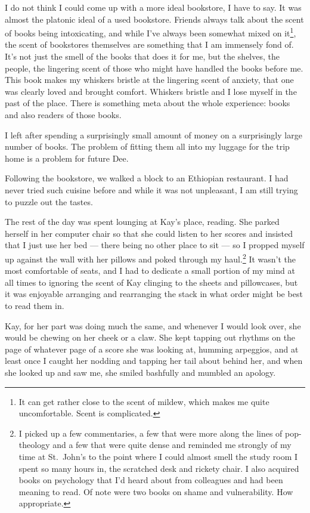 I do not think I could come up with a more ideal bookstore, I have to say. It was almost the platonic ideal of a used bookstore. Friends always talk about the scent of books being intoxicating, and while I've always been somewhat mixed on it\footnote{It can get rather close to the scent of mildew, which makes me quite uncomfortable. Scent is complicated.}, the scent of bookstores themselves are something that I am immensely fond of. It's not just the smell of the books that does it for me, but the shelves, the people, the lingering scent of those who might have handled the books before me. This book makes my whiskers bristle at the lingering scent of anxiety, that one was clearly loved and brought comfort. Whiskers bristle and I lose myself in the past of the place. There is something meta about the whole experience: books and also readers of those books.

I left after spending a surprisingly small amount of money on a surprisingly large number of books. The problem of fitting them all into my luggage for the trip home is a problem for future Dee.

Following the bookstore, we walked a block to an Ethiopian restaurant. I had never tried such cuisine before and while it was not unpleasant, I am still trying to puzzle out the tastes.

The rest of the day was spent lounging at Kay's place, reading. She parked herself in her computer chair so that she could listen to her scores and insisted that I just use her bed --- there being no other place to sit --- so I propped myself up against the wall with her pillows and poked through my haul.\footnote{I picked up a few commentaries, a few that were more along the lines of pop-theology and a few that were quite dense and reminded me strongly of my time at St.~John's to the point where I could almost smell the study room I spent so many hours in, the scratched desk and rickety chair. I also acquired books on psychology that I'd heard about from colleagues and had been meaning to read. Of note were two books on shame and vulnerability. How appropriate.} It wasn't the most comfortable of seats, and I had to dedicate a small portion of my mind at all times to ignoring the scent of Kay clinging to the sheets and pillowcases, but it was enjoyable arranging and rearranging the stack in what order might be best to read them in.

Kay, for her part was doing much the same, and whenever I would look over, she would be chewing on her cheek or a claw. She kept tapping out rhythms on the page of whatever page of a score she was looking at, humming arpeggios, and at least once I caught her nodding and tapping her tail about behind her, and when she looked up and saw me, she smiled bashfully and mumbled an apology.


